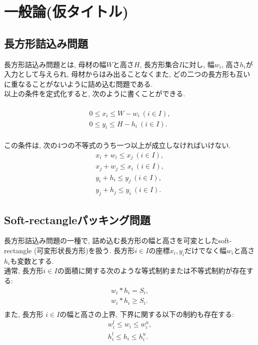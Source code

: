 \section{一般論(仮タイトル)}

\subsection{長方形詰込み問題}
長方形詰込み問題とは, 母材の幅$W$と高さ$H$, 長方形集合$I$に対し, 幅$w_i$, 高さ$h_i$が入力として与えられ, 母材からはみ出ることなくまた, どの二つの長方形も互いに重なることがないように詰め込む問題である. \\
以上の条件を定式化すると, 次のように書くことができる. \\
\\
\begin{eqnarray}
    0 \leq x_i \leq W-w_i \ (i \in I), \\
    0 \leq y_i \leq H-h_i \ (i \in I). 
\end{eqnarray}
\\
この条件は, 次の4つの不等式のうち一つ以上が成立しなければいけない.  
\begin{eqnarray}
    x_i + w_i \leq x_j \ (i \in I), \\
    x_j + w_j \leq x_i \ (i \in I), \\
    y_i + h_i \leq y_j \ (i \in I), \\
    y_j + h_j \leq y_i \ (i \in I). 
\end{eqnarray}

\subsection{Soft-rectangleパッキング問題}
長方形詰込み問題の一種で, 詰め込む長方形の幅と高さを可変としたsoft-rectangle (可変形状長方形)を扱う\cite{soft-rectangle}. 
長方形$i \in I$の座標$x_i,y_i$だけでなく幅$w_i$と高さ$h_i$も変数とする. \\
通常, 長方形$i \in I$の面積に関する次のような等式制約または不等式制約が存在する: \\
\begin{eqnarray}
    w_i * h_i = S_i, \\
    w_i * h_i \geq S_i. \\
\end{eqnarray}
また, 長方形 $i \in I$の幅と高さの上界, 下界に関する以下の制約も存在する: 
\begin{eqnarray}
    w_i^l \leq w_i \leq w_i^u, \\
    h_i^l \leq h_i \leq h_i^u. 
\end{eqnarray}

